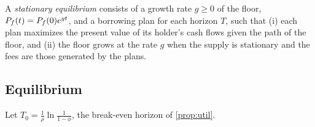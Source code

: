 \begin{definition}
A \emph{stationary equilibrium} consists of a growth rate $g\ge0$ of the floor, $P_f(t)=P_f(0)e^{gt}$, and a borrowing plan for each horizon $T$, such that (i) each plan maximizes the present value of its holder's cash flows given the path of the floor, and (ii) the floor grows at the rate $g$ when the supply is stationary and the fees are those generated by the plans.
\end{definition}

\subsection{Equilibrium}

Let $T_0=\frac1\rho\ln\frac1{1-\phi}$, the break-even horizon of \cref{prop:util}.

